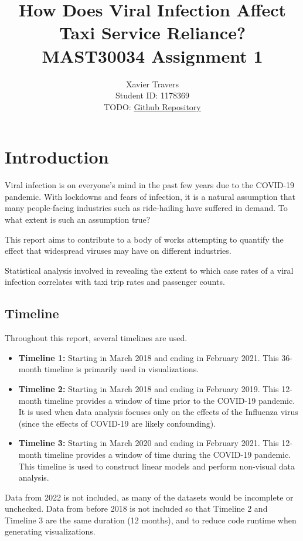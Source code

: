 \documentclass[11pt]{article}
\title{\textbf{How Does Viral Infection Affect Taxi Service Reliance?} \\ 
MAST30034 Assignment 1}
\author{
Xavier Travers \\
Student ID: 1178369 \\
TODO: \href{https://github.com/MAST30034-Applied-Data-Science/mast30034\_p1\_template/tree/fd9f1dd17fdbcb5b119b70c93a22da8210d44fd7}{Github Repository}
}
\begin{document}
\maketitle

\section{Introduction}

Viral infection is on everyone's mind in the past few years due to the COVID-19 pandemic.
With lockdowns and fears of infection, 
it is a natural assumption that many people-facing industries such as ride-hailing have suffered in demand.
To what extent is such an assumption true?

This report aims to contribute to a body of works attempting to quantify the effect that widespread viruses may have on different industries.

Statistical analysis involved in revealing the extent to which case rates of a viral infection correlates with taxi trip rates and passenger counts.

\subsection{Timeline}
Throughout this report, several timelines are used.
\begin{itemize}
    \item \textbf{Timeline 1:} Starting in March 2018 and ending in February 2021.
    This 36-month timeline is primarily used in visualizations.
    \item \textbf{Timeline 2:} Starting in March 2018 and ending in February 2019.
    This 12-month timeline provides a window of time prior to the COVID-19 pandemic.
    It is used when data analysis focuses only on the effects of the Influenza virus 
    (since the effects of COVID-19 are likely confounding).
    \item \textbf{Timeline 3:} Starting in March 2020 and ending in February 2021.
    This 12-month timeline provides a window of time during the COVID-19 pandemic.
    This timeline is used to construct linear models and perform non-visual data analysis.
\end{itemize}
Data from 2022 is not included, as many of the datasets would be incomplete or unchecked.
Data from before 2018 is not included so that Timeline 2 and Timeline 3 are the same duration (12 months), 
and to reduce code runtime when generating visualizations.
\end{document}
